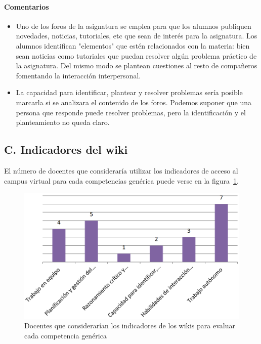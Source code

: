 \paragraph*{Comentarios}

\begin{itemize}
\item Uno de los foros de la asignatura se emplea para que los alumnos publiquen novedades, noticias, tutoriales, etc que sean de interés para la asignatura. Los alumnos identifican "elementos" que estén relacionados con la materia: bien sean noticias como tutoriales que puedan resolver algún problema práctico de la asignatura. Del mismo modo se plantean cuestiones al resto de compañeros fomentando la interacción interpersonal.
\item La capacidad para identificar, plantear y resolver problemas sería posible marcarla si se analizara el contenido de los foros. Podemos suponer que una persona que responde puede resolver problemas, pero la identificación y el planteamiento no queda claro.
\end{itemize}

	\subsection*{C. Indicadores del wiki}

El número de docentes que consideraría utilizar los indicadores de acceso al campus virtual para cada competencias genérica puede verse en la figura~\ref{fig:ape:aa:wikis}.

\begin{figure}[ht]
	\includegraphics[scale=0.35]{aa_wikis.png}
	\caption{Docentes que considerarían los indicadores de los wikis para evaluar cada competencia genérica}
	\label{fig:ape:aa:wikis}
\end{figure}


